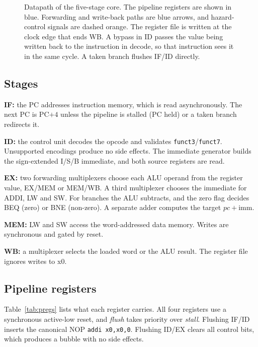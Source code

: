 \documentclass[conference]{IEEEtran}
\newcommand{\code}[1]{\texttt{\small #1}}
\begin{document}
\begin{figure}[t]
{}
\caption{Datapath of the five-stage core. The pipeline registers are shown in blue. Forwarding and write-back paths are blue arrows, and hazard-control signals are dashed orange. The register file is written at the clock edge that ends WB. A bypass in ID passes the value being written back to the instruction in decode, so that instruction sees it in the same cycle. A taken branch flushes IF/ID directly.}
\label{fig:datapath}
\end{figure}

\subsection{Stages}
\textbf{IF:} the PC addresses instruction memory, which is read asynchronously. The next PC is PC$+4$ unless the pipeline is stalled (PC held) or a taken branch redirects it.

\textbf{ID:} the control unit decodes the opcode and validates \code{funct3}/\code{funct7}. Unsupported encodings produce no side effects. The immediate generator builds the sign-extended I/S/B immediate, and both source registers are read.

\textbf{EX:} two forwarding multiplexers choose each ALU operand from the register value, EX/MEM or MEM/WB. A third multiplexer chooses the immediate for ADDI, LW and SW. For branches the ALU subtracts, and the zero flag decides BEQ (zero) or BNE (non-zero). A separate adder computes the target $pc+\mathrm{imm}$.

\textbf{MEM:} LW and SW access the word-addressed data memory. Writes are synchronous and gated by reset.

\textbf{WB:} a multiplexer selects the loaded word or the ALU result. The register file ignores writes to x0.

\subsection{Pipeline registers}
Table~\ref{tab:pregs} lists what each register carries. All four registers use a synchronous active-low reset, and \emph{flush} takes priority over \emph{stall}. Flushing IF/ID inserts the canonical NOP \code{addi x0,x0,0}. Flushing ID/EX clears all control bits, which produces a bubble with no side effects.
\end{document}
